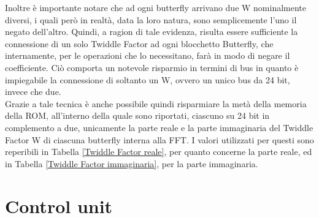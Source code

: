 \documentclass[a4paper, titlepage]{article}
\begin{document}
Inoltre è importante notare che ad ogni butterfly arrivano due W nominalmente diversi, i quali però in realtà, data la loro natura, sono semplicemente l'uno il negato dell'altro. Quindi, a ragion di tale evidenza, risulta essere sufficiente la connessione di un solo Twiddle Factor ad ogni blocchetto Butterfly, che internamente, per le operazioni che lo necessitano, farà in modo di negare il coefficiente. Ciò comporta un notevole risparmio in termini di bus in quanto è impiegabile la connessione di soltanto un W, ovvero un unico bus da 24 bit, invece che due.
\\Grazie a tale tecnica è anche possibile quindi risparmiare la metà della memoria della ROM, all'interno della quale sono riportati, ciascuno su 24 bit in complemento a due, unicamente la parte reale e la parte immaginaria del Twiddle Factor W di ciascuna butterfly interna alla FFT. I valori utilizzati per questi sono reperibili in Tabella \ref{Twiddle Factor reale}, per quanto concerne la parte reale, ed in Tabella \ref{Twiddle Factor immaginaria}, per la parte immaginaria.
\section{Control unit}
\end{document}
